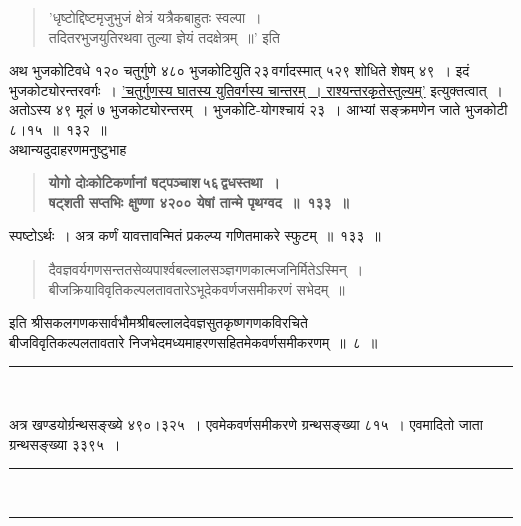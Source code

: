 \documentclass[11pt, openany]{book}
\begin{document}
\newpage

\begin{sloppypar}
\begin{quote}
{\color{violet}'धृष्टोद्दिष्टमृजुभुजं क्षेत्रं यत्रैकबाहुतः स्वल्पा~।\\
तदितरभुजयुतिरथवा तुल्या ज्ञेयं तदक्षेत्रम्~॥'} इति
\end{quote}

अथ भुजकोटिवधे १२० चतुर्गुणे ४८० भुजकोटियुति\textendash \,२३\textendash \,वर्गादस्मात् ५२९ शोधिते शेषम् ४९~। इदं भुजकोट्योरन्तरवर्गः~। \hyperref[8.131]{'चतुर्गुणस्य घातस्य युतिवर्गस्य चान्तरम्~। राश्यन्तरकृतेस्तुल्यम्'} इत्युक्तत्वात्~। अतोऽस्य ४९ मूलं ७ भुजकोट्योरन्तरम्~। भुजकोटि-योगश्चायं २३~। आभ्यां सङ्क्रमणेन जाते भुजकोटी ८।१५~॥~१३२~॥\\

{\small अथान्यदुदाहरणमनुष्टुभाह\textendash }

 \label{8.133}
\begin{quote}
{\large \textbf{{\color{purple}योगो दोःकोटिकर्णानां षट्पञ्चाश\textendash \,५६\textendash \,द्वधस्तथा~।\\
षट्शती सप्तभिः क्षुण्णा ४२०० येषां तान्मे पृथग्वद~॥~१३३~॥}}}
\end{quote}

स्पष्टोऽर्थः~। अत्र कर्णं यावत्तावन्मितं प्रकल्प्य गणितमाकरे स्फुटम्~॥~१३३~॥
\vspace{2mm}

\begin{quote}
{\color{violet}दैवज्ञवर्यगणसन्ततसेव्यपार्श्वबल्लालसञ्ज्ञगणकात्मजनिर्मितेऽस्मिन्~।\\
बीजक्रियाविवृतिकल्पलतावतारेऽभूदेकवर्णजसमीकरणं सभेदम्~॥}
\end{quote}
\vspace{-4mm}

\begin{center}
इति श्रीसकलगणकसार्वभौमश्रीबल्लालदेवज्ञसुतकृष्णगणकविरचिते~~~\\
बीजविवृतिकल्पलतावतारे निजभेदमध्यमाहरणसहितमेकवर्णसमीकरणम्~॥~८~॥
\vspace{2mm}

\rule{0.2\linewidth}{0.8pt}\\
\end{center}

अत्र खण्डयोर्ग्रन्थसङ्ख्ये ४९०।३२५~। एवमेकवर्णसमीकरणे ग्रन्थसङ्ख्या ८१५~। एवमादितो जाता ग्रन्थसङ्ख्या ३३९५~।

\begin{center}
\rule{0.2\linewidth}{0.8pt}\\
\vspace{-4mm}

\rule{0.2\linewidth}{0.8pt}
\end{center}

\end{sloppypar}
\end{document}
